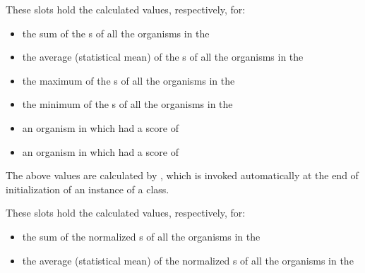 {	\filbreak
	{\samepage
		\par}%
	
	\filbreak
	{\samepage
		\par}%
	
	\filbreak
	{\samepage
		\par}%
	
	\medskip
	
	
	
	\filbreak
	{\samepage
		These slots hold the calculated values, respectively, for:
		\begin{itemize}
			\item the sum of the s of all the organisms in the 
			\item the average (statistical mean) of the s of all the
			organisms in the 
			\item the maximum of the s of all the organisms in the 
			\item the minimum of the s of all the organisms in the 
			\item an organism in  which had a score of 
			\item an organism in  which had a score of 
		\end{itemize}
	}%
	
	The above values are calculated by ,
	which is invoked automatically at the end of initialization
	of an instance of a  class.
	
	\filbreak
	{\samepage
		
		
		These slots hold the calculated values, respectively, for:
		\begin{itemize}
			\item the sum of the normalized s of all the
			organisms in the 
			\item the average (statistical mean) of the normalized s of all the
			organisms in the 
		\end{itemize}
	}%
	
}
